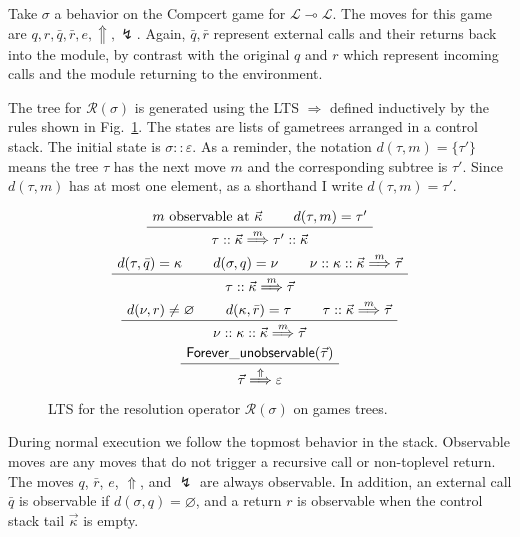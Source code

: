 \documentclass[11pt]{article}
\newcommand{\kw}[1]{{\mathsf{#1}}}
\begin{document}
Take $\sigma$ a behavior on the Compcert game for
$\mathcal{L} \multimap \mathcal{L}$.
The moves for this game are $q, r, \bar{q}, \bar{r}, e, \Uparrow, \lightning$.
Again, $\bar{q}, \bar{r}$ represent external calls and their returns
back into the module,
by contrast with the original $q$ and $r$ which represent
incoming calls and the module returning to the environment.

The tree for $\mathcal{R}(\sigma)$ is generated
using the LTS $\Rightarrow$ defined inductively
by the rules shown in Fig.~\ref{fig:res}.
The states are lists of gametrees arranged in a control stack.
The initial state is $\sigma :: \varepsilon$.
As a reminder,
the notation $d(\tau, m) = \{\tau'\}$ means
the tree $\tau$ has the next move $m$
and the corresponding subtree is $\tau'$.
Since $d(\tau, m)$ has at most one element,
as a shorthand I write $d(\tau, m) = \tau'$.

\begin{figure}
\[
  \AxiomC{$m \mbox{ observable at } \vec{\kappa}$}
  \AxiomC{$d(\tau, m) = \tau'$}
  \BinaryInfC{$\tau :: \vec{\kappa} \stackrel{m}{\Longrightarrow} \tau' :: \vec{\kappa}$}
  \DisplayProof
\]
\vspace{.5em}
\[
  \AxiomC{$d(\tau, \bar{q}) = \kappa$}
  \AxiomC{$d(\sigma, q) = \nu$}
  \AxiomC{$\nu :: \kappa :: \vec{\kappa} \stackrel{m}{\Longrightarrow} \vec{\tau}$}
  \TrinaryInfC{$\tau :: \vec{\kappa} \stackrel{m}{\Longrightarrow} \vec{\tau}$}
  \DisplayProof
\]
\vspace{.5em}
\[
  \AxiomC{$d(\nu, r) \ne \varnothing$}
  \AxiomC{$d(\kappa, \bar{r}) = \tau$}
  \AxiomC{$\tau :: \vec{\kappa} \stackrel{m}{\Longrightarrow} \vec{\tau}$}
  \TrinaryInfC{$\nu :: \kappa :: \vec{\kappa} \stackrel{m}{\Longrightarrow} \vec{\tau}$}
  \DisplayProof
\]
\vspace{.5em}
\[
  \AxiomC{$\kw{Forever\_unobservable}(\vec{\tau})$}
  \UnaryInfC{$\vec{\tau} \stackrel{\Uparrow}{\Longrightarrow} \varepsilon$}
  \DisplayProof
\]
\caption{LTS for the resolution operator
  $\mathcal{R}(\sigma)$ on games trees.}
\label{fig:res}
\end{figure}

During normal execution we follow the topmost behavior in the stack.
Observable moves are any moves that do not trigger a recursive call
or non-toplevel return.
The moves $q$, $\bar{r}$, $e$, $\Uparrow$, and $\lightning$
are always observable.
In addition,
an external call $\bar{q}$
is observable if $d(\sigma, q) = \varnothing$,
and a return $r$
is observable when the control stack tail $\vec{\kappa}$ is empty.
\end{document}
